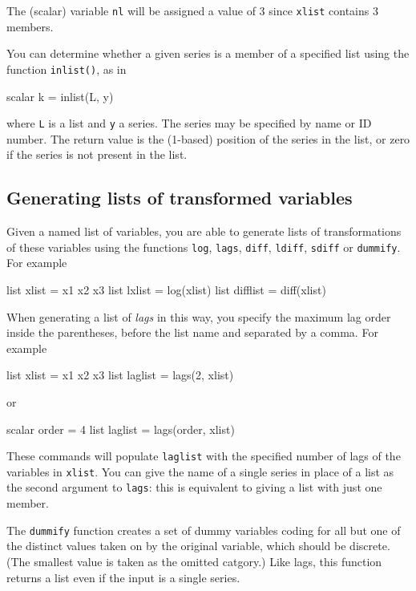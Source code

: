 The (scalar) variable \texttt{nl} will be assigned a value of 3 since
\texttt{xlist} contains 3 members.

You can determine whether a given series is a member of a specified
list using the function \texttt{inlist()}, as in
%
\begin{code}
scalar k = inlist(L, y)
\end{code}
%
where \texttt{L} is a list and \texttt{y} a series. The series may
be specified by name or ID number. The return value is the (1-based)
position of the series in the list, or zero if the series is not
present in the list. 

\subsection{Generating lists of transformed variables}
\label{sec:transform-lists}

Given a named list of variables, you are able to generate lists of
transformations of these variables using the functions \texttt{log},
\texttt{lags}, \texttt{diff}, \texttt{ldiff}, \texttt{sdiff} or
\texttt{dummify}.  For example
%
\begin{code}
list xlist = x1 x2 x3
list lxlist = log(xlist)
list difflist = diff(xlist)
\end{code}

When generating a list of \textit{lags} in this way, you specify the
maximum lag order inside the parentheses, before the list name and
separated by a comma.  For example
%
\begin{code}
list xlist = x1 x2 x3
list laglist = lags(2, xlist)
\end{code}
%
or
%
\begin{code}
scalar order = 4
list laglist = lags(order, xlist)
\end{code}

These commands will populate \texttt{laglist} with the specified
number of lags of the variables in \texttt{xlist}.  You can give the
name of a single series in place of a list as the second argument to
\texttt{lags}: this is equivalent to giving a list with just one
member.

The \texttt{dummify} function creates a set of dummy variables coding
for all but one of the distinct values taken on by the original
variable, which should be discrete.  (The smallest value is taken as
the omitted catgory.)  Like lags, this function returns a list even if
the input is a single series.

